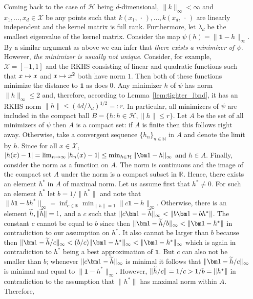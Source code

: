 \documentclass[10pt]{amsart}
\theoremstyle{definition}\newtheorem{defi}[theo]{Definition}\newtheorem{rema}[theo]{Remark}\newtheorem{exam}[theo]{Example}\newtheorem{exem}[theo]{Example}\newtheorem{nota}[theo]{Notation}
\theoremstyle{remark}
\newcommand{\R}{\mathbb{R}}
\newcommand{\bbN}{\mathbb{N}}
\newcommand{\X}{\mathcal{X}}
\newcommand{\cH}{\mathcal{H}}
\let\oldtilde\tilde
\renewcommand*{\tilde}[1]{\mathchoice{\widetilde{#1}}{\widetilde{#1}}{\oldtilde{#1}}{\oldtilde{#1}}}
\renewcommand*{\to}{\mathchoice{\longrightarrow}{\rightarrow}{\rightarrow}{\rightarrow}}
\let\oldmapsto\mapsto
\renewcommand*{\mapsto}{\mathchoice{\longmapsto}{\oldmapsto}{\oldmapsto}{\oldmapsto}}
\begin{document}
Coming back to the case of $\cH$ being $d$-dimensional, $\|k\|_\infty < \infty$ and $x_1,\dots,x_d \in \X$ be any points such that $k(x_1,\,\cdot\,),\dots, k(x_d,\,\cdot\,)$ are linearly independent and the kernel matrix is full rank. Furthermore, let $\lambda_d$ be the smallest eigenvalue of the kernel matrix. Consider the map $\psi(h) = \|\bm 1 - h\|_\infty$. By a similar argument as above we can infer that \emph{there exists a minimizer of $\psi$}. However, \emph{the minimizer is usually not unique}. Consider, for example, $\X = [-1,1]$ and the RKHS consisting of linear and quadratic functions such that $x\mapsto x$ and $x\mapsto x^2$ both have norm $1$. Then both of these functions minimize the distance to $\bm 1$ as does $0$. Any minimizer $h$ of $\psi$ has norm $\|h\|_\infty \leq 2$ and, therefore, according to Lemma~\ref{lem:tighter_lbnd}, it has an RKHS norm $\|h\| \leq (4d/\lambda_d)^{1/2} =: r$. In particular, all minimizers of $\psi$ are included in the compact ball $B = \{ h : h \in \cH, \|h \| \leq r\}$. Let $A$ be the set of all minimizers of $\psi$ then $A$ is a compact set: if $A$ is finite then this follows right away. Otherwise, take a convergent sequence $\{h_n\}_{n\in \bbN}$ in $A$ and denote the limit by $h$. Since for all $x\in \X$, $|h(x) - 1| = \lim_{n\to \infty} |h_n(x) -1| \leq \min_{h\in \cH} \|\bm 1 -h \|_\infty$ and $h \in A$. Finally, consider the norm as a function on $A$. The norm is continuous and the image of the compact set $A$ under the norm is a compact subset in $\R$. Hence, there exists an element $h^*$ in $A$ of maximal norm. Let us assume first that $h^*\not = 0$. For such an element $h^*$ let $b = 1/\|h^*\|$ and note that$\|b \bm 1 - b h^*\|_\infty = \inf_{c \in \R} \min_{\|h\|=1} \|c \bm 1 - h\|_\infty$. Otherwise, there is an element $\tilde h, \|\tilde h\|=1,$ and a $c$ such that $\|c \bm 1 - \tilde h\|_\infty < \| b \bm 1 - b h^*\|$. The constant $c$ cannot be equal to $b$ since then $\|\bm 1 - \tilde h/b \|_\infty < \| \bm 1 - h^*\|$ in contradiction to our assumption on $h^*$. It also cannot be larger than $b$ because then $\|\bm 1 - \tilde h /c \|_\infty < (b/c) \|\bm 1- h^*\|_\infty < \|\bm 1 -h^*\|_\infty$ which is again in contradiction to $h^*$ being a best approximation of $\bm 1$. But $c$ can also not be smaller than $b$; whenever $\|c \bm 1 - \tilde h\|_\infty$ is minimal it follows that $\|\bm 1 - \tilde h/c\|_\infty$ is minimal and equal to $\|\bm 1 - h^*\|_\infty$. However, $\|\tilde h / c \| = 1/c > 1/b = \|h^*\|$ in contradiction to the assumption that $\|h^*\|$ has maximal norm within $A$. Therefore,
\end{document}
